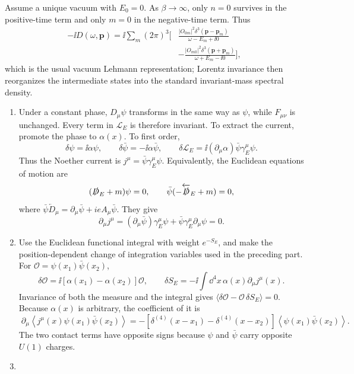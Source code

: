 \begin{enumerate}
Assume a unique vacuum with \(E_0=0\).  As \(\beta\to\infty\), only
\(n=0\) survives in the positive-time term and only \(m=0\) in the
negative-time term.  Thus
\[
 \begin{split}
 -\ii D(\omega,\mathbf p)=\ii\sum_m(2\pi)^3\Bigg[
 &\frac{|O_{0m}|^2\delta^3(\mathbf p-\mathbf p_m)}
       {\omega-E_m+\ii0}\\
 &-\frac{|O_{m0}|^2\delta^3(\mathbf p+\mathbf p_m)}
       {\omega+E_m-\ii0}\Bigg],
 \end{split}
\]
which is the usual vacuum Lehmann representation; Lorentz invariance then
reorganizes the intermediate states into the standard invariant-mass
spectral density.

\begin{enumerate}
\item
Under a constant phase, \(D_\mu\psi\) transforms in the same way as
\(\psi\), while \(F_{\mu\nu}\) is unchanged.  Every term in
\(\mathcal L_E\) is therefore invariant.  To extract the current, promote
the phase to \(\alpha(x)\).  To first order,
\[
 \delta\psi=\ii\alpha\psi,\qquad
 \delta\bar\psi=-\ii\alpha\bar\psi,\qquad
 \delta\mathcal L_E=\ii(\partial_\mu\alpha)
 \bar\psi\gamma_E^\mu\psi.
\]
Thus the Noether current is \(j^\mu=\bar\psi\gamma_E^\mu\psi\).
Equivalently, the Euclidean equations of motion are
\[
 (\slashed D_E+m)\psi=0,\qquad
 \bar\psi(-\overleftarrow{\slashed D}_E+m)=0,
\]
where
\(\bar\psi\overleftarrow D_\mu=\partial_\mu\bar\psi+ieA_\mu\bar\psi\).
They give
\[
 \partial_\mu j^\mu
 =(\partial_\mu\bar\psi)\gamma_E^\mu\psi
 +\bar\psi\gamma_E^\mu\partial_\mu\psi=0.
\]
\item
Use the Euclidean functional integral with weight \(e^{-S_E}\), and make
the position-dependent change of integration variables used in the
preceding part.  For
\(\mathcal O=\psi(x_1)\bar\psi(x_2)\),
\[
 \delta\mathcal O
 =\ii[\alpha(x_1)-\alpha(x_2)]\mathcal O,
\qquad
 \delta S_E
 =-\ii\int \dd^4x\,\alpha(x)\partial_\mu j^\mu(x).
\]
Invariance of both the measure and the integral gives
\(\langle\delta\mathcal O-\mathcal O\,\delta S_E\rangle=0\).
Because \(\alpha(x)\) is arbitrary, the coefficient of it is
\[
 \boxed{\;
 \partial_\mu\left\langle
 j^\mu(x)\psi(x_1)\bar\psi(x_2)\right\rangle
 =-\left[\delta^{(4)}(x-x_1)-\delta^{(4)}(x-x_2)\right]
 \left\langle\psi(x_1)\bar\psi(x_2)\right\rangle.\;}
\]
The two contact terms have opposite signs because \(\psi\) and
\(\bar\psi\) carry opposite \(U(1)\) charges.
\item

\end{enumerate}
\end{enumerate}

